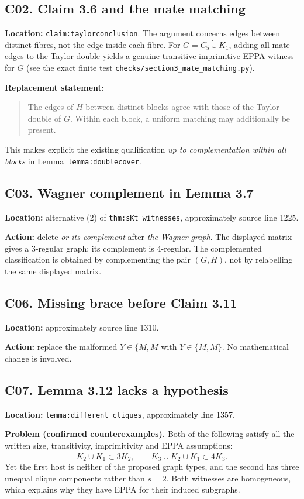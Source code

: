 \documentclass[11pt,a4paper]{article}
\begin{document}
\subsection*{C02. Claim 3.6 and the mate matching}
\textbf{Location:} \texttt{claim:taylorconclusion}.
The argument concerns edges between distinct fibres, not
the edge inside each fibre. For
\(G=C_5\dot\cup K_1\), adding all mate edges to the
Taylor double yields a genuine transitive imprimitive EPPA
witness for \(G\) (see the exact finite test
\texttt{checks/section3\_mate\_matching.py}).

\textbf{Replacement statement:}
\begin{quote}
The edges of \(H\) between distinct blocks agree with those
of the Taylor double of \(G\). Within each block, a
uniform matching may additionally be present.
\end{quote}
This makes explicit the existing qualification
\emph{up to complementation within all blocks} in
Lemma~\texttt{lemma:doublecover}.

\subsection*{C03. Wagner complement in Lemma 3.7}
\textbf{Location:} alternative (2) of
\texttt{thm:sKt\_witnesses}, approximately source line 1225.

\textbf{Action:} delete \emph{or its complement} after
\emph{the Wagner graph}. The displayed matrix gives a
3-regular graph; its complement is 4-regular.
The complemented classification is obtained by
complementing the pair \((G,H)\), not by relabelling
the same displayed matrix.

\subsection*{C06. Missing brace before Claim 3.11}
\textbf{Location:} approximately source line 1310.

\textbf{Action:} replace the malformed
\(Y\in\{M,\overline M\) with
\(Y\in\{M,\overline M\}\).
No mathematical change is involved.


\subsection*{C07. Lemma 3.12 lacks a hypothesis}
\textbf{Location:} \texttt{lemma:different\_cliques},
approximately line 1357.

\textbf{Problem (confirmed counterexamples).}
Both of the following satisfy all the written size,
transitivity, imprimitivity and EPPA assumptions:
\[
K_2\dot\cup K_1\subset 3K_2,\qquad
K_3\dot\cup K_2\dot\cup K_1\subset 4K_3.
\]
Yet the first host is neither of the proposed graph types,
and the second has three unequal clique components
rather than \(s=2\). Both witnesses are homogeneous,
which explains why they have EPPA for their induced
subgraphs.
\end{document}
